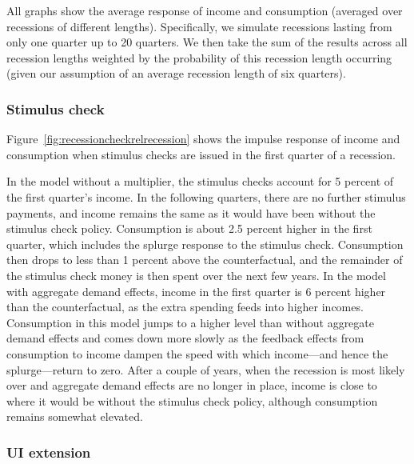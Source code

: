 \documentclass[../HAFiscal]{subfiles}
\begin{document}
All graphs show the average response of income and consumption (averaged over recessions of different lengths).
Specifically, we simulate recessions lasting from only one quarter up to 20 quarters.
We then take the sum of the results across all recession lengths weighted by the probability of this recession length occurring (given our assumption of an average recession length of six quarters).

\subsubsection{Stimulus check}

Figure~\ref{fig:recessioncheckrelrecession} shows the impulse response of income and consumption when stimulus checks are issued in the first quarter of a recession.


In the model without a multiplier, the stimulus checks account for 5 percent of the first quarter's income.
In the following quarters, there are no further stimulus payments, and income remains the same as it would have been without the stimulus check policy.
Consumption is about 2.5 percent higher in the first quarter, which includes the splurge response to the stimulus check.
Consumption then drops to less than 1 percent above the counterfactual, and the remainder of the stimulus check money is then spent over the next few years.
In the model with aggregate demand effects, income in the first quarter is 6 percent higher than the counterfactual, as the extra spending feeds into higher incomes.
Consumption in this model jumps to a higher level than without aggregate demand effects and comes down more slowly as the feedback effects from consumption to income dampen the speed with which income---and hence the splurge---return to zero.
After a couple of years, when the recession is most likely over and aggregate demand effects are no longer in place, income is close to where it would be without the stimulus check policy, although consumption remains somewhat elevated.

\subsubsection{UI extension}
\end{document}
